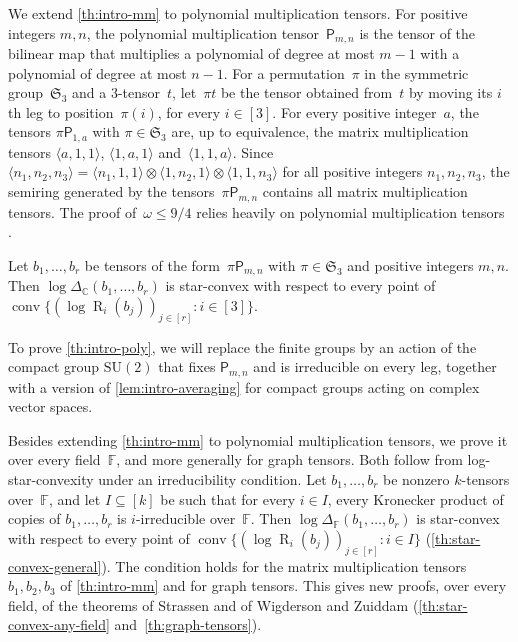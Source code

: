 \documentclass[11pt,letterpaper]{article}
\DeclareMathOperator{\tensorrank}{R}
\newcommand{\polymult}{\mathsf{P}}
\newcommand{\FF}{\mathbb{F}}
\newcommand{\CC}{\mathbb{C}}
\DeclareMathOperator{\conv}{conv}
\begin{document}
We extend \cref{th:intro-mm} to polynomial multiplication tensors.
For positive integers \(m,n\), the polynomial multiplication tensor~\(\polymult_{m,n}\) is the tensor of the bilinear map that multiplies a polynomial of degree at most \(m-1\) with a polynomial of degree at most \(n-1\). For a permutation~\(\pi\) in the symmetric group~\(\mathfrak{S}_3\) and a \(3\)-tensor~\(t\), let~\(\pi t\) be the tensor obtained from~\(t\) by moving its \(i\)th leg to position~\(\pi(i)\), for every \(i\in[3]\). For every positive integer~\(a\), the tensors \(\pi\polymult_{1,a}\) with \(\pi\in\mathfrak{S}_3\) are, up to equivalence, the matrix multiplication tensors \(\langle a,1,1\rangle\), \(\langle1,a,1\rangle\) and~\(\langle1,1,a\rangle\). Since \(\langle n_1,n_2,n_3\rangle=\langle n_1,1,1\rangle\otimes\langle1,n_2,1\rangle\otimes\langle1,1,n_3\rangle\) for all positive integers \(n_1,n_2,n_3\), the semiring generated by the tensors~\(\pi\polymult_{m,n}\) contains all matrix multiplication tensors. The proof of~\(\omega\leq9/4\) relies heavily on polynomial multiplication tensors \cite{OAI:Matrix-Multiplication-Nine-Fourths-October-2-2026,amanov2026multiplyingmatricespolynomialsexposition}.

\begin{theorem}\label{th:intro-poly}
Let \(b_1,\ldots,b_r\) be tensors of the form~\(\pi\polymult_{m,n}\) with \(\pi\in\mathfrak{S}_3\) and positive integers \(m,n\). Then \(\log\Delta_\CC(b_1,\ldots,b_r)\) is star-convex with respect to every point of \(\conv\{(\log\tensorrank_i(b_j))_{j\in[r]}:i\in[3]\}\).
\end{theorem}

To prove \cref{th:intro-poly}, we will replace the finite groups by an action of the compact group \(\mathrm{SU}(2)\) that fixes \(\polymult_{m,n}\) and is irreducible on every leg, together with a version of \cref{lem:intro-averaging} for compact groups acting on complex vector spaces.

Besides extending \cref{th:intro-mm} to polynomial multiplication tensors, we prove it over every field~\(\FF\), and more generally for graph tensors. Both follow from log-star-convexity under an irreducibility condition. Let \(b_1,\ldots,b_r\) be nonzero \(k\)-tensors over~\(\FF\), and let \(I\subseteq[k]\) be such that for every \(i\in I\), every Kronecker product of copies of \(b_1,\ldots,b_r\) is \(i\)-irreducible over~\(\FF\). Then \(\log\Delta_\FF(b_1,\ldots,b_r)\) is star-convex with respect to every point of \(\conv\{(\log\tensorrank_i(b_j))_{j\in[r]}:i\in I\}\) (\cref{th:star-convex-general}). The condition holds for the matrix multiplication tensors \(b_1,b_2,b_3\) of \cref{th:intro-mm} and for graph tensors. This gives new proofs, over every field, of the theorems of Strassen \cite[Theorem~3.10 and Corollary~6.6]{strassen1988asymptotic} and of Wigderson and Zuiddam \cite[Theorem~12.23]{wigderson2022asymptotic} (\cref{th:star-convex-any-field} and~\cref{th:graph-tensors}).
\end{document}
